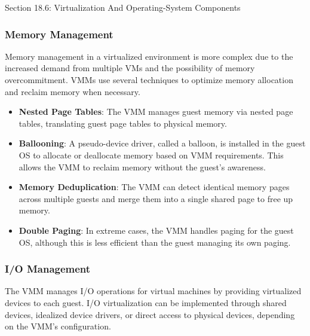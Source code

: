 \begin{notes}{Section 18.6: Virtualization And Operating-System Components}
    \subsubsection*{Memory Management}
    
    Memory management in a virtualized environment is more complex due to the increased demand from multiple VMs and the possibility of memory overcommitment. VMMs use several techniques to optimize 
    memory allocation and reclaim memory when necessary.
    
    \begin{highlight}
    
        \begin{itemize}
            \item \textbf{Nested Page Tables}: The VMM manages guest memory via nested page tables, translating guest page tables to physical memory.
            \item \textbf{Ballooning}: A pseudo-device driver, called a balloon, is installed in the guest OS to allocate or deallocate memory based on VMM requirements. This allows the VMM to reclaim 
            memory without the guest's awareness.
            \item \textbf{Memory Deduplication}: The VMM can detect identical memory pages across multiple guests and merge them into a single shared page to free up memory.
            \item \textbf{Double Paging}: In extreme cases, the VMM handles paging for the guest OS, although this is less efficient than the guest managing its own paging.
        \end{itemize}
    
    \end{highlight}
    
    \subsubsection*{I/O Management}
    
    The VMM manages I/O operations for virtual machines by providing virtualized devices to each guest. I/O virtualization can be implemented through shared devices, idealized device drivers, or direct 
    access to physical devices, depending on the VMM's configuration.
    
    \begin{highlight}[I/O Management]
    

\end{highlight}
\end{notes}
